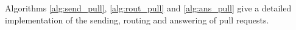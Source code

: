 Algorithms \ref{alg:send_pull}, \ref{alg:rout_pull} and \ref{alg:ans_pull} give a detailed implementation of the sending, routing and answering of pull requests.







